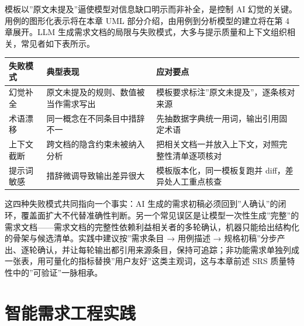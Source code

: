 \documentclass[
]{ctexbook}
\newcounter{none}
\begin{document}
模板以''原文未提及''逼使模型对信息缺口明示而非补全，是控制 AI
幻觉的关键。用例的图形化表示将在本章 UML
部分介绍，由用例到分析模型的建立将在第 4 章展开。LLM
生成需求文档的局限与失败模式，大多与提示质量和上下文组织相关，常见者如下表所示。

{\def\LTcaptype{none} %
\begin{longtable}[]{@{}
  >{\raggedright\arraybackslash}p{}
  >{\raggedright\arraybackslash}p{}
  >{\raggedright\arraybackslash}p{}@{}}
\toprule\noalign{}
\begin{minipage}[b]{\linewidth}\raggedright
失败模式
\end{minipage} & \begin{minipage}[b]{\linewidth}\raggedright
典型表现
\end{minipage} & \begin{minipage}[b]{\linewidth}\raggedright
应对要点
\end{minipage} \\
\midrule\noalign{}
\endhead
\bottomrule\noalign{}
\endlastfoot
幻觉补全 & 原文未提及的规则、数值被当作需求写出 &
模板要求标注''原文未提及''，逐条核对来源 \\
术语漂移 & 同一概念在不同条目中措辞不一 &
先抽数据字典统一用词，输出引用固定术语 \\
上下文截断 & 跨文档的隐含约束未被纳入分析 &
把相关文档一并放入上下文，对照完整性清单逐项核对 \\
提示词敏感 & 措辞微调导致输出差异很大 & 模板版本化，同一模板复跑并
diff，差异处人工重点核查 \\
\end{longtable}
}

这四种失败模式共同指向一个事实：AI
生成的需求初稿必须回到''人确认''的闭环，覆盖面扩大不代替准确性判断。另一个常见误区是让模型一次性生成''完整''的需求文档------需求文档的完整性依赖利益相关者的多轮确认，机器只能给出结构化的骨架与候选清单。实践中建议按''需求条目
→ 用例描述 →
规格初稿''分步产出、逐轮确认，并让每轮输出都引用来源条目，保持可追踪；非功能需求单独列成一张表，用可量化的指标替换''用户友好''这类主观词，这与本章前述
SRS 质量特性中的''可验证''一脉相承。

\section{智能需求工程实践}\label{ux667aux80fdux9700ux6c42ux5de5ux7a0bux5b9eux8df5}
\end{document}
